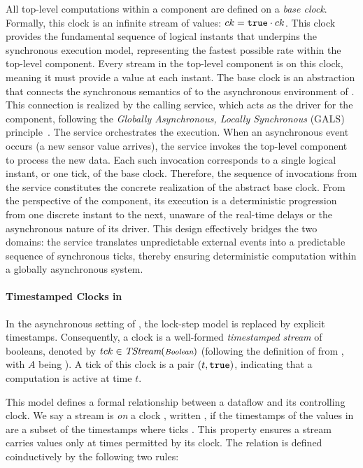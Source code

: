 All top-level computations within a \GRSync component are defined on a \emph{base clock}. Formally,
this clock is an infinite stream of \true values: $ck = \mathtt{{true}} \cdot ck$.
%
This clock provides the fundamental sequence of logical instants that underpins the synchronous
execution model, representing the fastest possible rate within the top-level component. Every
stream in the top-level component is on this clock, meaning it must provide a value at each instant.
%
The base clock is an abstraction that connects the synchronous semantics of \GRSync to the
asynchronous environment of \GRust. This connection is realized by the calling \GRFRP service, which
acts as the driver for the \GRSync component, following the
\emph{Globally Asynchronous, Locally Synchronous} (GALS) principle~\cite{DBLP:phd/us/Chapiro85}.
%
The \GRFRP service orchestrates the execution. When an asynchronous event occurs (\eg a new sensor
value arrives), the service invokes the top-level component to process the new data. Each such
invocation corresponds to a single logical instant, or one \true tick, of the base clock.
%
Therefore, the sequence of invocations from the \GRFRP service constitutes the concrete realization
of the abstract base clock. From the perspective of the component, its execution is a deterministic
progression from one discrete instant to the next, unaware of the real-time delays or the
asynchronous nature of its driver. This design effectively bridges the two domains: the \GRFRP
service translates unpredictable external events into a predictable sequence of synchronous ticks,
thereby ensuring deterministic computation within a globally asynchronous system.

\paragraph{Timestamped Clocks in \GRFRP}

In the asynchronous setting of \GRFRP, the lock-step model is replaced by explicit timestamps.
Consequently, a clock is a well-formed \emph{timestamped stream} of booleans, denoted by
$tck \in \textit{TStream}(\mbox{\footnotesize\ensuremath{\textit{Boolean}}})$ (following the definition of  from
, with $A$ being \Bool). A tick of this clock is a pair
$(t, \mathtt{{true}})$, indicating that a computation is active at time $t$.

This model defines a formal relationship between a dataflow and its controlling clock. We say a
stream \ts is \emph{on} a clock \tck, written \on{\ts}{\tck}, if the timestamps of the values in \ts
are a subset of the timestamps where \tck ticks \true. This property ensures a stream carries values
only at times permitted by its clock. The relation is defined coinductively by the following two
rules:

